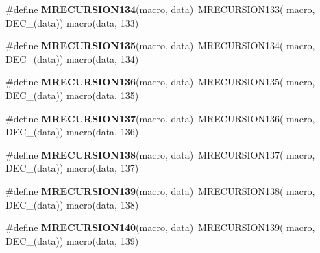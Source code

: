 \begin{DoxyCompactItemize}
\item 
\hypertarget{group__group__sam0__utils__mrecursion_ga340283014fb8ab457e6a67b1549aa8a1}{}\#define {\bfseries M\+R\+E\+C\+U\+R\+S\+I\+O\+N134}(macro,  data)~M\+R\+E\+C\+U\+R\+S\+I\+O\+N133(  macro, D\+E\+C\+\_\+(data))   macro(data, 133)\label{group__group__sam0__utils__mrecursion_ga340283014fb8ab457e6a67b1549aa8a1}

\item 
\hypertarget{group__group__sam0__utils__mrecursion_ga0ef1de26f3cd3e214e5b96910167f8ec}{}\#define {\bfseries M\+R\+E\+C\+U\+R\+S\+I\+O\+N135}(macro,  data)~M\+R\+E\+C\+U\+R\+S\+I\+O\+N134(  macro, D\+E\+C\+\_\+(data))   macro(data, 134)\label{group__group__sam0__utils__mrecursion_ga0ef1de26f3cd3e214e5b96910167f8ec}

\item 
\hypertarget{group__group__sam0__utils__mrecursion_ga14dc3ff957489f36ff0edd97c663379b}{}\#define {\bfseries M\+R\+E\+C\+U\+R\+S\+I\+O\+N136}(macro,  data)~M\+R\+E\+C\+U\+R\+S\+I\+O\+N135(  macro, D\+E\+C\+\_\+(data))   macro(data, 135)\label{group__group__sam0__utils__mrecursion_ga14dc3ff957489f36ff0edd97c663379b}

\item 
\hypertarget{group__group__sam0__utils__mrecursion_gab821ae0bbb999d5fd6e068b577603f95}{}\#define {\bfseries M\+R\+E\+C\+U\+R\+S\+I\+O\+N137}(macro,  data)~M\+R\+E\+C\+U\+R\+S\+I\+O\+N136(  macro, D\+E\+C\+\_\+(data))   macro(data, 136)\label{group__group__sam0__utils__mrecursion_gab821ae0bbb999d5fd6e068b577603f95}

\item 
\hypertarget{group__group__sam0__utils__mrecursion_ga77d047e7ca2ab8a69562bd7cd7f62186}{}\#define {\bfseries M\+R\+E\+C\+U\+R\+S\+I\+O\+N138}(macro,  data)~M\+R\+E\+C\+U\+R\+S\+I\+O\+N137(  macro, D\+E\+C\+\_\+(data))   macro(data, 137)\label{group__group__sam0__utils__mrecursion_ga77d047e7ca2ab8a69562bd7cd7f62186}

\item 
\hypertarget{group__group__sam0__utils__mrecursion_ga1de6fa2750176e2d386c0e8e6d937476}{}\#define {\bfseries M\+R\+E\+C\+U\+R\+S\+I\+O\+N139}(macro,  data)~M\+R\+E\+C\+U\+R\+S\+I\+O\+N138(  macro, D\+E\+C\+\_\+(data))   macro(data, 138)\label{group__group__sam0__utils__mrecursion_ga1de6fa2750176e2d386c0e8e6d937476}

\item 
\hypertarget{group__group__sam0__utils__mrecursion_gad48f900c9eaf24623bd027ea995b45ad}{}\#define {\bfseries M\+R\+E\+C\+U\+R\+S\+I\+O\+N140}(macro,  data)~M\+R\+E\+C\+U\+R\+S\+I\+O\+N139(  macro, D\+E\+C\+\_\+(data))   macro(data, 139)\label{group__group__sam0__utils__mrecursion_gad48f900c9eaf24623bd027ea995b45ad}


\end{DoxyCompactItemize}
